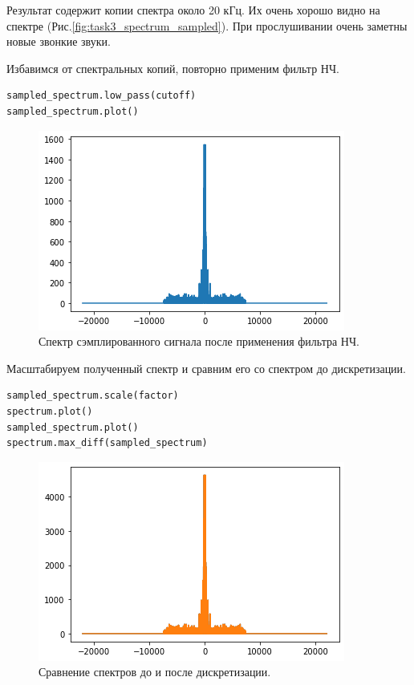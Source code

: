 \documentclass[a4paper, 14pt]{extarticle}
\begin{document}
    Результат содержит копии спектра около 20 кГц. Их очень хорошо видно на спектре (Рис.\ref{fig:task3_spectrum_sampled}).
    При прослушивании очень заметны новые звонкие звуки.

    Избавимся от спектральных копий, повторно применим фильтр НЧ.


    \begin{lstlisting}[caption= Повторное применение фильтра НЧ., label={lst:task3_spectrum_sampled_low_pass}]
sampled_spectrum.low_pass(cutoff)
sampled_spectrum.plot()     \end{lstlisting}

    \begin{figure}[h]
        \centering
        \includegraphics[width=0.7\linewidth]{resources/Images/task3_spectrum_sampled_low_pass}
        \caption{Спектр сэмплированного сигнала после применения фильтра НЧ.}
        \label{fig:task3_spectrum_sampled_low_pass}
    \end{figure}

    Масштабируем полученный спектр и сравним его со спектром до дискретизации.

    \begin{lstlisting}[caption= Сравнение спектров., label={lst:task3_compare_spectrum}]
sampled_spectrum.scale(factor)
spectrum.plot()
sampled_spectrum.plot()
spectrum.max_diff(sampled_spectrum)     \end{lstlisting}

    \begin{figure}[H]
        \centering
        \includegraphics[width=0.7\linewidth]{resources/Images/task3_compare_spectrum}
        \caption{Сравнение спектров до и после дискретизации.}
        \label{fig:task3_compare_spectrum}
    \end{figure}
\end{document}
